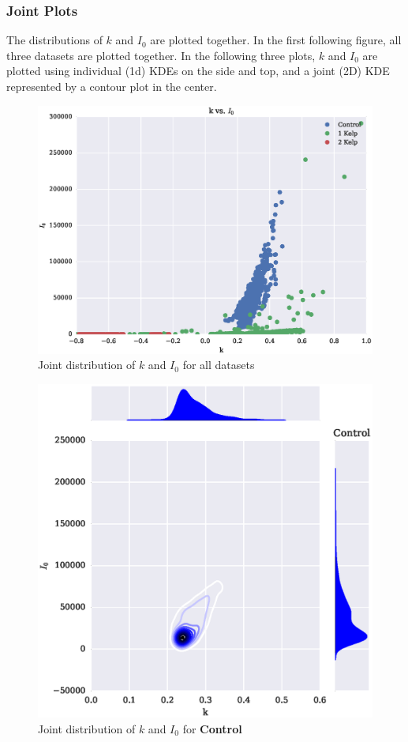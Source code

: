 \documentclass{article}
\begin{document}
\subsubsection{Joint Plots}

The distributions of $k$ and $I_0$ are plotted together. In the first following figure, all three datasets are plotted together. In the following three plots, $k$ and $I_0$ are plotted using individual (1d) KDEs on the side and top, and a joint (2D) KDE represented by a contour plot in the center.

\begin{figure}[H]
	\centering
	\includegraphics[width=\textwidth]{plots/k_I0.eps}
	\caption{Joint distribution of $k$ and $I_0$ for all datasets}
\end{figure}

\begin{figure}[H]
	\centering
	\includegraphics[width=\textwidth]{plots/joint_control.eps}
	\caption{Joint distribution of $k$ and $I_0$ for \textbf{Control}}
	\label{joint_control}
\end{figure}
\end{document}
